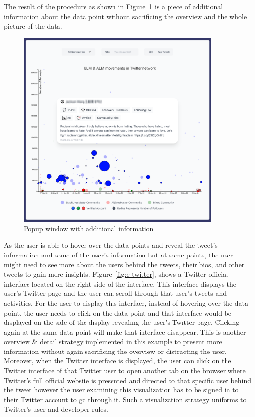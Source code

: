 
The result of the procedure as shown in Figure~\ref{fig:e-popup} is a piece of additional information about the data point without sacrificing the overview and the whole picture of the data.


\begin{figure}[H]
\centering
\captionsetup{justification=centering}
\includegraphics[width=0.9\textwidth]{Report-latex/tex_files/pics/example/popup.png}
\caption{Popup window with additional information}
\label{fig:e-popup}
\end{figure}

As the user is able to hover over the data points and reveal the tweet's information and some of the user's information but at some points, the user might need to see more about the users behind the tweets, their bios, and other tweets to gain more insights. Figure~\ref{fig:e-twitter}, shows a Twitter official interface located on the right side of the interface. This interface displays the user's Twitter page and the user can scroll through that user's tweets and activities. For the user to display this interface, instead of hovering over the data point, the user needs to click on the data point and that interface would be displayed on the side of the display revealing the user's Twitter page. Clicking again at the same data point will make that interface disappear. This is another overview \& detail strategy implemented in this example to present more information without again sacrificing the overview or distracting the user. Moreover, when the Twitter interface is displayed, the user can click on the Twitter interface of that Twitter user to open another tab on the browser where Twitter's full official website is presented and directed to that specific user behind the tweet however the user examining this visualization has to be signed in to their Twitter account to go through it. Such a visualization strategy uniforms to Twitter's user and developer rules.


